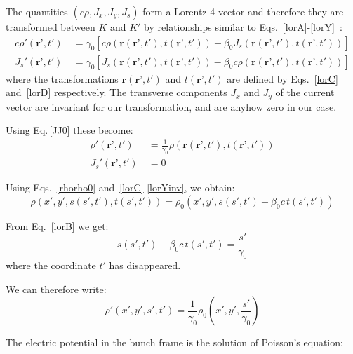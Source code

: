 The quantities $\left(c \rho, J_x, J_y, J_s\right)$ form a Lorentz 4-vector and therefore they are transformed between $K$ and $K'$ by relationships similar to Eqs.~\ref{lorA}-\ref{lorY}~\cite{jackson}:
\begin{align}
c\rho' \left(\textbf{r'}, t'\right)\ &= \gamma_0 \left[c \rho  \left(\textbf{r}\left(\textbf{r'}, t'\right), t\left(\textbf{r'}, t'\right)\right) -\beta_0 J_s \left(\textbf{r}\left(\textbf{r'}, t'\right), t\left(\textbf{r'}, t'\right)\right) \right]\label{lorrho}\\
J_s' \left(\textbf{r'}, t'\right)\ &= \gamma_0 \left[J_s  \left(\textbf{r}\left(\textbf{r'}, t'\right), t\left(\textbf{r'}, t'\right)\right) -\beta_0 c \rho \left(\textbf{r}\left(\textbf{r'}, t'\right), t\left(\textbf{r'}, t'\right)\right) \right]\label{lorjs}
\end{align}
where the transformations $\textbf{r}\left(\textbf{r'}, t'\right)$ and $t\left(\textbf{r'}, t'\right)$ are defined by Eqs.~\ref{lorC} and~\ref{lorD} respectively. The transverse components $J_x$ and $J_y$ of the current vector are invariant for our transformation, and are anyhow zero in our case.

Using Eq.\,\ref{JJ0} these become:
\begin{align}
\rho' \left(\textbf{r'}, t'\right)\ &= \frac{1}{\gamma_0}\rho\left(\textbf{r}\left(\textbf{r'}, t'\right), t\left(\textbf{r'}, t'\right)\right)
\\
J_s' \left(\textbf{r'}, t'\right)\ & = 0
\end{align}

Using Eqs.~\ref{rhorho0} and~\ref{lorC}-\ref{lorYinv}, we obtain:
\begin{equation}
\rho  \left(x', y', s(s', t'), t(s', t')\right) = \rho_0  \left(x', y', s(s', t') - \beta_0 c\,t(s', t')\right)
\end{equation}

From Eq.~\ref{lorB} we get:
\begin{equation}
s(s', t')- \beta_0 c\,t(s', t') = \frac{s'}{\gamma_0} 
\end{equation}
where the coordinate $t' $ has disappeared.

We can therefore write:
\begin{equation}
\rho' \left(x', y', s', t'\right) =   \frac{1}{\gamma_0} \rho_0  \left(x', y',  \frac{s'}{\gamma_0}\right)\label{rhoprimerho0}
\end{equation}

The electric potential in the bunch frame is the solution of Poisson's equation:

